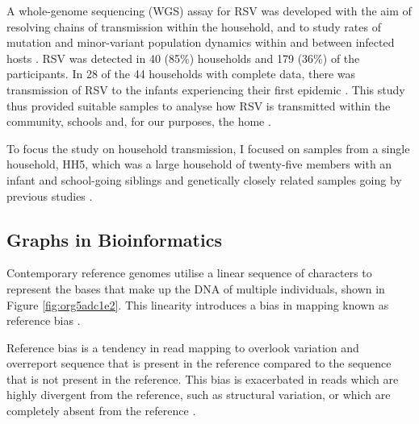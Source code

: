 \documentclass[10pt, a4paper]{article}
\begin{document}
A whole-genome sequencing (WGS) assay for RSV was developed with the aim of
resolving chains of transmission within the household, and to study rates of
mutation and minor-variant population dynamics within and between infected hosts
\cite{agotiGeneticDiversityRespiratory2014}.
RSV was detected in 40 (85\%) households and 179 (36\%) of the participants.
In 28 of the 44 households with complete data, there was transmission of RSV to
the infants experiencing their first epidemic
\cite{munywokiTransmissionRespiratorySyncytial2013}.
This study thus provided suitable samples to analyse how RSV is transmitted
within the community, schools and, for our purposes, the home
\cite{agotiTransmissionPatternsEvolution2017,agotiGenomicAnalysisRespiratory2019,githinjiAssessingUtilityMinority2018,kinyanjuiVaccineInducedHerd2015,munywokiInfluenceAgeSeverity2015}. 

To focus the study on household transmission, I focused on samples from a single
household, HH5, which was a large household of twenty-five members with an
infant and school-going siblings and genetically closely related samples going
by previous studies
\cite{githinjiAssessingUtilityMinority2018,agotiGenomicAnalysisRespiratory2019}.


\newpage

\subsection{Graphs in Bioinformatics}
\label{sec:org7b2ba71}
Contemporary reference genomes utilise a linear sequence of characters to
represent the bases that make up the DNA of multiple individuals, shown in
Figure \ref{fig:org5adc1e2}.
This linearity introduces a bias in mapping known as reference bias
\cite{degnerEffectReadmappingBiases2009,diltheyImprovedGenomeInference2015}.

Reference bias is a tendency in read mapping to overlook variation and
overreport sequence that is present in the reference compared to the sequence
that is not present in the reference.
This bias is exacerbated in reads which are highly divergent from the reference,
such as structural variation, or which are completely absent from the reference
\cite{degnerEffectReadmappingBiases2009,schneebergerSimultaneousAlignmentShort2009,liBuildingSequenceMap2010,brandtMappingBiasOverestimates2015,patenGenomeGraphsEvolution2017,garrisonVariationGraphToolkit2018}.
\end{document}
